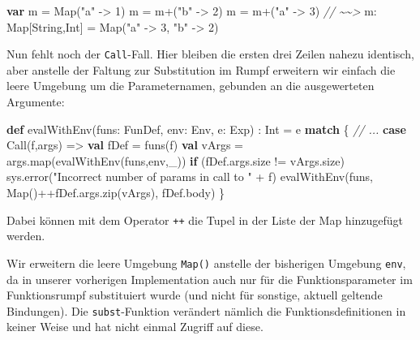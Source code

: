 \documentclass[]{article}
\newenvironment{Shaded}{}{}
\newcommand{\CommentTok}[1]{\textcolor[rgb]{0.38,0.63,0.69}{\textit{#1}}}
\newcommand{\DecValTok}[1]{\textcolor[rgb]{0.25,0.63,0.44}{#1}}
\newcommand{\FunctionTok}[1]{\textcolor[rgb]{0.02,0.16,0.49}{#1}}
\newcommand{\KeywordTok}[1]{\textcolor[rgb]{0.00,0.44,0.13}{\textbf{#1}}}
\newcommand{\NormalTok}[1]{#1}
\newcommand{\StringTok}[1]{\textcolor[rgb]{0.25,0.44,0.63}{#1}}
\begin{document}
\begin{Shaded}
\begin{Highlighting}[]
\KeywordTok{var}\NormalTok{ m = Map(}\StringTok{"a"}\NormalTok{ {-}\textgreater{} }\DecValTok{1}\NormalTok{)}
\NormalTok{m = m+(}\StringTok{"b"}\NormalTok{ {-}\textgreater{} }\DecValTok{2}\NormalTok{)}
\NormalTok{m = m+(}\StringTok{"a"}\NormalTok{ {-}\textgreater{} }\DecValTok{3}\NormalTok{)}
\CommentTok{// \textasciitilde{}\textasciitilde{}\textgreater{}}
\NormalTok{m: Map[String,Int] = Map(}\StringTok{"a"}\NormalTok{ {-}\textgreater{} }\DecValTok{3}\NormalTok{, }\StringTok{"b"}\NormalTok{ {-}\textgreater{} }\DecValTok{2}\NormalTok{)}
\end{Highlighting}
\end{Shaded}

Nun fehlt noch der \texttt{Call}-Fall. Hier bleiben die ersten drei
Zeilen nahezu identisch, aber anstelle der Faltung zur Substitution im
Rumpf erweitern wir einfach die leere Umgebung um die Parameternamen,
gebunden an die ausgewerteten Argumente:

\begin{Shaded}
\begin{Highlighting}[]
\KeywordTok{def} \FunctionTok{evalWithEnv}\NormalTok{(funs: FunDef, env: Env, e: Exp) : Int = e }\KeywordTok{match}\NormalTok{ \{}
\CommentTok{// ...}
  \KeywordTok{case} \FunctionTok{Call}\NormalTok{(f,args) =\textgreater{}}
    \KeywordTok{val}\NormalTok{ fDef = }\FunctionTok{funs}\NormalTok{(f)}
    \KeywordTok{val}\NormalTok{ vArgs = args.}\FunctionTok{map}\NormalTok{(}\FunctionTok{evalWithEnv}\NormalTok{(funs,env,\_))}
    \KeywordTok{if}\NormalTok{ (fDef.}\FunctionTok{args}\NormalTok{.}\FunctionTok{size}\NormalTok{ != vArgs.}\FunctionTok{size}\NormalTok{)}
\NormalTok{      sys.}\FunctionTok{error}\NormalTok{(}\StringTok{"Incorrect number of params in call to "}\NormalTok{ + f)}
    \FunctionTok{evalWithEnv}\NormalTok{(funs, Map()++fDef.}\FunctionTok{args}\NormalTok{.}\FunctionTok{zip}\NormalTok{(vArgs), fDef.}\FunctionTok{body}\NormalTok{)}
\NormalTok{\}}
\end{Highlighting}
\end{Shaded}

Dabei können mit dem Operator \texttt{++} die Tupel in der Liste der Map
hinzugefügt werden.

Wir erweitern die leere Umgebung \texttt{Map()} anstelle der bisherigen
Umgebung \texttt{env}, da in unserer vorherigen Implementation auch nur
für die Funktionsparameter im Funktionsrumpf substituiert wurde (und
nicht für sonstige, aktuell geltende Bindungen). Die
\texttt{subst}-Funktion verändert nämlich die Funktionsdefinitionen in
keiner Weise und hat nicht einmal Zugriff auf diese.
\end{document}
